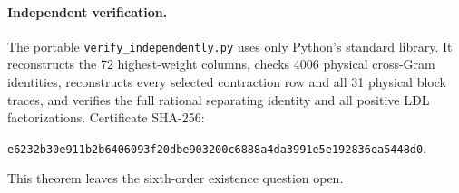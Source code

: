 \documentclass[11pt]{article}
\begin{document}
\paragraph{Independent verification.}
The portable \texttt{verify\_independently.py} uses only Python's standard library. It reconstructs the 72 highest-weight columns, checks 4006 physical cross-Gram identities, reconstructs every selected contraction row and all 31 physical block traces, and verifies the full rational separating identity and all positive LDL factorizations. Certificate SHA-256:
\begin{center}\small\texttt{e6232b30e911b2b6406093f20dbe903200c6888a4da3991e5e192836ea5448d0}.\end{center}
This theorem leaves the sixth-order existence question open.
\end{document}

